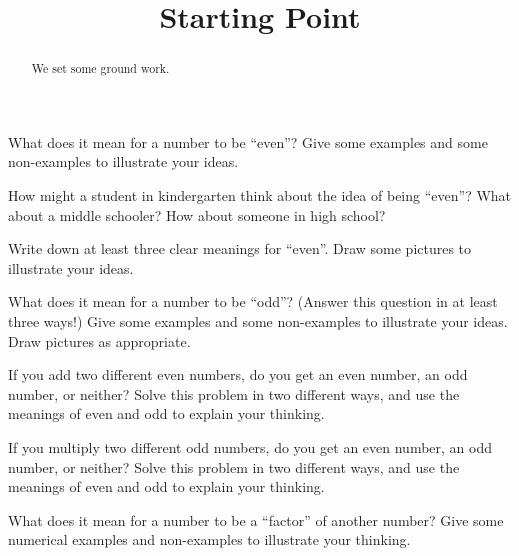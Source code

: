 \documentclass[nooutcomes,noauthor,handout]{ximera}
\title{Starting Point}
\begin{document}
\begin{abstract} We set some ground work. \end{abstract}
\maketitle



\begin{problem} What does it mean for a number to be ``even''? Give some examples and some non-examples to illustrate your ideas.
\end{problem}

\begin{problem} How might a student in kindergarten think about the idea of being ``even''? What about a middle schooler? How about someone in high school?
\end{problem}


\begin{problem} Write down at least three clear meanings for ``even''. Draw some pictures to illustrate your ideas.
\end{problem}

\begin{problem} What does it mean for a number to be ``odd''? (Answer this question in at least three ways!) Give some examples and some non-examples to illustrate your ideas. Draw pictures as appropriate.
\end{problem}


\newpage

\begin{problem}
If you add two different even numbers, do you get an even number, an odd number, or neither? Solve this problem in two different ways, and use the meanings of even and odd to explain your thinking.
\end{problem}


\begin{problem}
If you multiply two different odd numbers, do you get an even number, an odd number, or neither? Solve this problem in two different ways, and use the meanings of even and odd to explain your thinking.
\end{problem}


\newpage



\begin{problem} What does it mean for a number to be a ``factor'' of another number? Give some numerical examples and non-examples to illustrate your thinking.
\end{problem}
\end{document}
